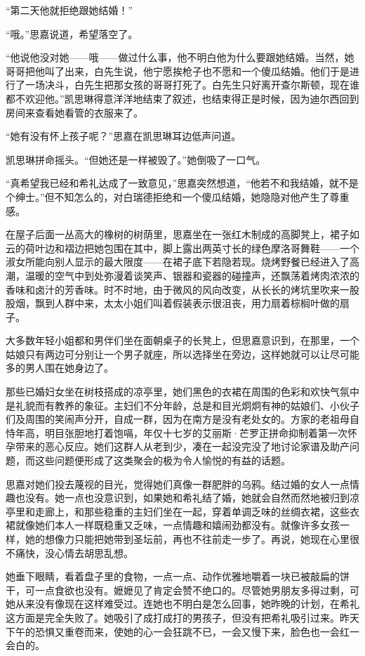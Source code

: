 \par “第二天他就拒绝跟她结婚！”
\par “哦。”思嘉说道，希望落空了。
\par “他说他没对她——哦——做过什么事，他不明白他为什么要跟她结婚。当然，她哥哥把他叫了出来，白先生说，他宁愿挨枪子也不愿和一个傻瓜结婚。他们于是进行了一场决斗，白先生把那女孩的哥哥打死了。白先生只好离开查尔斯顿，现在谁都不欢迎他。”凯思琳得意洋洋地结束了叙述，也结束得正是时候，因为迪尔西回到房间来查看她看管的衣服来了。
\par “她有没有怀上孩子呢？”思嘉在凯思琳耳边低声问道。
\par 凯思琳拼命摇头。“但她还是一样被毁了。”她倒吸了一口气。
\par “真希望我已经和希礼达成了一致意见，”思嘉突然想道，“他若不和我结婚，就不是个绅士。”但不知怎么的，对白瑞德拒绝和一个傻瓜结婚，她隐隐对他产生了尊重感。
\par  
\par 在屋子后面一丛高大的橡树的树荫里，思嘉坐在一张红木制成的高脚凳上，裙子如云的荷叶边和褶边把她包围在其中，脚上露出两英寸长的绿色摩洛哥舞鞋——一个淑女所能向别人显示的最大限度——在裙子底下若隐若现。烧烤野餐已经进入了高潮，温暖的空气中到处弥漫着谈笑声、银器和瓷器的碰撞声，还飘荡着烤肉浓浓的香味和卤汁的芳香味。时不时地，由于微风的风向改变，从长长的烤坑里吹来一股股烟，飘到人群中来，太太小姐们叫着假装表示很沮丧，用力扇着棕榈叶做的扇子。
\par 大多数年轻小姐都和男伴们坐在面朝桌子的长凳上，但思嘉意识到，在那里，一个姑娘只有两边可分别让一个男子就座，所以选择坐在旁边，这样她就可以让尽可能多的男人围在她身边了。
\par 那些已婚妇女坐在树枝搭成的凉亭里，她们黑色的衣裙在周围的色彩和欢快气氛中是礼貌而有教养的象征。主妇们不分年龄，总是和目光炯炯有神的姑娘们、小伙子们及周围的笑闹声分开，自成一群，因为在南方是没有老处女的。方家的老祖母自恃年高，明目张胆地打着饱嗝，年仅十七岁的艾丽斯·芒罗正拼命抑制着第一次怀孕带来的恶心反应。她们这群人从老到少，凑在一起没完没了地讨论家谱及助产问题，而这些问题便形成了这类聚会的极为令人愉悦的有益的话题。
\par 思嘉对她们投去蔑视的目光，觉得她们真像一群肥胖的乌鸦。结过婚的女人一点情趣也没有。她一点也没意识到，如果她和希礼结了婚，她就会自然而然地被归到凉亭里和走廊上，和那些稳重的主妇们坐在一起，穿着单调乏味的丝绸衣裙，这些衣裙就像她们本人一样既稳重又乏味，一点情趣和嬉闹劲都没有。就像许多女孩一样，她的想像力只能把她带到圣坛前，再也不往前走一步了。再说，她现在心里很不痛快，没心情去胡思乱想。
\par 她垂下眼睛，看着盘子里的食物，一点一点、动作优雅地嚼着一块已被敲扁的饼干，可一点食欲也没有。嬷嬷见了肯定会赞不绝口的。尽管她男朋友多得过剩，可她从来没有像现在这样难受过。连她也不明白是怎么回事，她昨晚的计划，在希礼这方面是完全失败了。她吸引了成打成打的男孩子，但没有把希礼吸引过来。昨天下午的恐惧又重卷而来，使她的心一会狂跳不已，一会又慢下来，脸色也一会红一会白的。
